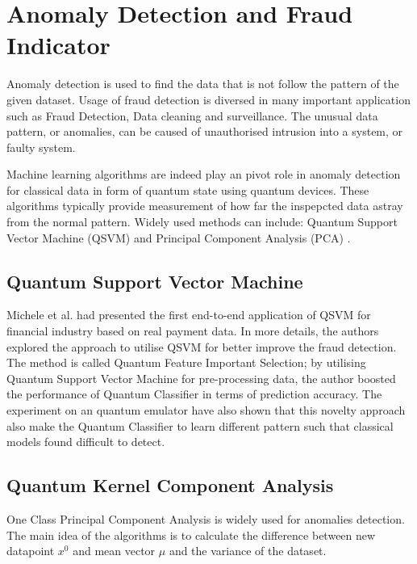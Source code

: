 \section{Anomaly Detection and Fraud Indicator} \label{Sec: Anomaly Detection and Fraud Indicator}

Anomaly detection is used to find the data that is not follow the pattern of the given dataset.
Usage of fraud detection is diversed in many important application such as Fraud Detection, Data cleaning and surveillance.
The unusual data pattern, or anomalies, can be caused of unauthorised intrusion into a system, or faulty system.

Machine learning algorithms are indeed play an pivot role in anomaly detection for classical data in form of quantum state using quantum devices.
These algorithms typically provide measurement of how far the inspepcted data astray from the normal pattern.
Widely used methods can include: Quantum Support Vector Machine (QSVM) \cite{grossiMixedQuantumClassical2022,kyriienkoUnsupervisedQuantumMachine2022} and Principal Component Analysis (PCA) \cite{lloydQuantumPrincipalComponent2014a}.

\subsection{Quantum Support Vector Machine}
Michele et al. \cite{grossiMixedQuantumClassical2022} had presented the first end-to-end application of QSVM for financial industry based on real payment data.
In more details, the authors explored the approach to utilise QSVM for better improve the fraud detection.
The method is called Quantum Feature Important Selection; by utilising Quantum Support Vector Machine for pre-processing data, the author boosted the performance of Quantum Classifier in terms of prediction accuracy.
The experiment on an quantum emulator have also shown that this novelty approach also make the Quantum Classifier to learn different pattern such that classical models found difficult to detect.

\subsection{Quantum Kernel Component Analysis}
One Class Principal Component Analysis is widely used for anomalies detection.
The main idea of the algorithms is to calculate the difference between new datapoint $x^0$ and mean vector $\mu$ and the variance of the dataset.


